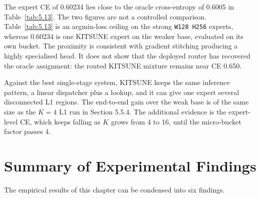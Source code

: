 The expert CE of 0.60234 lies close to the oracle cross-entropy of 0.6005 in Table~\ref{tab:5.13}. The two figures are not a controlled comparison. Table~\ref{tab:5.13} is an argmin-loss ceiling on the strong \texttt{W128 H256} experts, whereas 0.60234 is one KITSUNE expert on the weaker base, evaluated on its own bucket. The proximity is consistent with gradient stitching producing a highly specialised head. It does not show that the deployed router has recovered the oracle assignment: the routed KITSUNE mixture remains near CE 0.650.

Against the best single-stage system, KITSUNE keeps the same inference pattern, a linear dispatcher plus a lookup, and it can give one expert several disconnected L1 regions. The end-to-end gain over the weak base is of the same size as the $K=4$ L1 run in Section 5.5.4. The additional evidence is the expert-level CE, which keeps falling as $K$ grows from 4 to 16, until the micro-bucket factor passes 4.

\section{Summary of Experimental Findings}

The empirical results of this chapter can be condensed into six findings.

